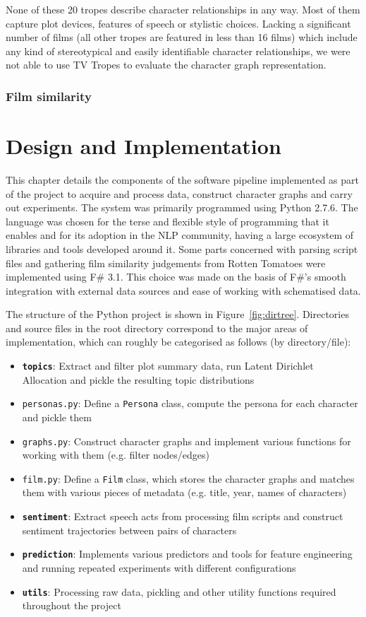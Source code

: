 \documentclass[bsc,frontabs,singlespacing,parskip]{infthesis} %
\begin{document}
None of these 20 tropes describe character relationships in any way. Most of them capture plot devices, features of speech or stylistic choices. Lacking a significant number of films (all other tropes are featured in less than 16 films) which include any kind of stereotypical and easily identifiable character relationships, we were not able to use TV Tropes to evaluate the character graph representation.

\subsection{Film similarity}

\chapter{Design and Implementation}

This chapter details the components of the software pipeline implemented as part of the project to acquire and process data, construct character graphs and carry out experiments. The system was primarily programmed using Python 2.7.6. The language was chosen for the terse and flexible style of programming that it enables and for its adoption in the NLP community, having a large ecosystem of libraries and tools developed around it. Some parts concerned with parsing script files and gathering film similarity judgements from Rotten Tomatoes were implemented using F\# 3.1. This choice was made on the basis of F\#'s smooth integration with external data sources and ease of working with schematised data.

The structure of the Python project is shown in Figure~\ref{fig:dirtree}. Directories and source files in the root directory correspond to the major areas of implementation, which can roughly be categorised as follows (by directory/file):
\begin{itemize}
	\item \texttt{\textbf{topics}}:  Extract and filter plot summary data, run Latent Dirichlet Allocation and pickle the resulting topic distributions
	\item \texttt{personas.py}: Define a \texttt{Persona} class, compute the persona for each character and pickle them
	\item \texttt{graphs.py}: Construct character graphs and implement various functions for working with them (e.g. filter nodes/edges)
	\item \texttt{film.py}: Define a \texttt{Film} class, which stores the character graphs and matches them with various pieces of metadata (e.g. title, year, names of characters)
	\item \texttt{\textbf{sentiment}}: Extract speech acts from processing film scripts and construct sentiment trajectories between pairs of characters
	\item \texttt{\textbf{prediction}}: Implements various predictors and tools for feature engineering and running repeated experiments with different configurations
	\item \texttt{\textbf{utils}}: Processing raw data, pickling and other utility functions required throughout the project
\end{itemize}
\end{document}

